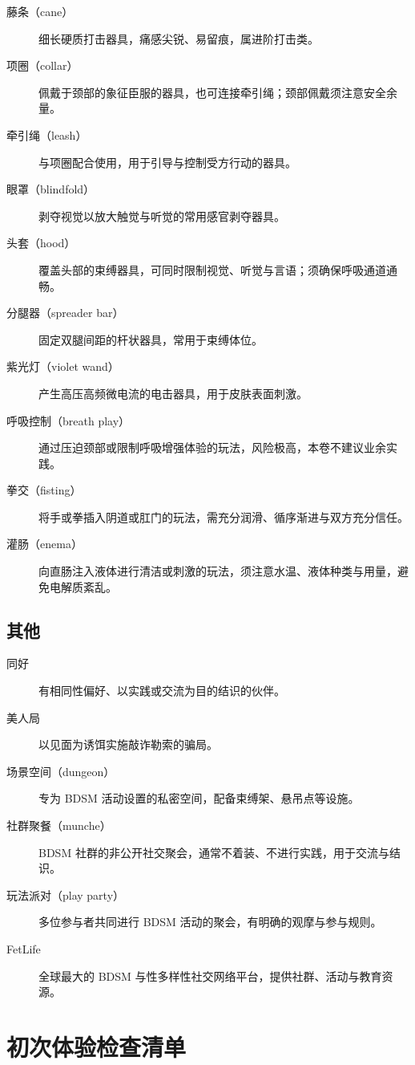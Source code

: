 \documentclass[12pt,UTF8]{ctexbook}
\begin{document}
\begin{description}
\item[藤条（cane）] 细长硬质打击器具，痛感尖锐、易留痕，属进阶打击类。
\item[项圈（collar）] 佩戴于颈部的象征臣服的器具，也可连接牵引绳；颈部佩戴须注意安全余量。
\item[牵引绳（leash）] 与项圈配合使用，用于引导与控制受方行动的器具。
\item[眼罩（blindfold）] 剥夺视觉以放大触觉与听觉的常用感官剥夺器具。
\item[头套（hood）] 覆盖头部的束缚器具，可同时限制视觉、听觉与言语；须确保呼吸通道通畅。
\item[分腿器（spreader bar）] 固定双腿间距的杆状器具，常用于束缚体位。
\item[紫光灯（violet wand）] 产生高压高频微电流的电击器具，用于皮肤表面刺激。
\item[呼吸控制（breath play）] 通过压迫颈部或限制呼吸增强体验的玩法，风险极高，本卷不建议业余实践。
\item[拳交（fisting）] 将手或拳插入阴道或肛门的玩法，需充分润滑、循序渐进与双方充分信任。
\item[灌肠（enema）] 向直肠注入液体进行清洁或刺激的玩法，须注意水温、液体种类与用量，避免电解质紊乱。
\end{description}

\section{其他}

\begin{description}
\item[同好] 有相同性偏好、以实践或交流为目的结识的伙伴。
\item[美人局] 以见面为诱饵实施敲诈勒索的骗局。
\item[场景空间（dungeon）] 专为 BDSM 活动设置的私密空间，配备束缚架、悬吊点等设施。
\item[社群聚餐（munche）] BDSM 社群的非公开社交聚会，通常不着装、不进行实践，用于交流与结识。
\item[玩法派对（play party）] 多位参与者共同进行 BDSM 活动的聚会，有明确的观摩与参与规则。
\item[FetLife] 全球最大的 BDSM 与性多样性社交网络平台，提供社群、活动与教育资源。
\end{description}


\chapter{初次体验检查清单}\label{chap:checklist}
\end{document}
